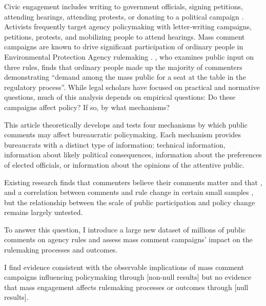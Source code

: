 \documentclass{article}
\begin{document}
Civic engagement includes writing to government officials, signing petitions, attending hearings, attending protests, or donating to a political campaign \citep{Verba1987}. %
Activists frequently target agency policymaking with letter-writing campaigns, petitions, protests, and mobilizing people to attend hearings. 
Mass comment campaigns are known to drive significant participation of ordinary people in Environmental Protection Agency rulemaking \citet{Potter2017, Balla2018}. \citet{Cuellar2005}, who examines public input on three rules, finds that ordinary people made up the majority of commenters demonstrating ``demand among the mass public for a seat at the table in the regulatory process''. While legal scholars have focused on practical and normative questions, much of this analysis depends on empirical questions: Do these campaigns affect policy? If so, by what mechanisms? 

This article theoretically develops and tests four mechanisms by which public comments may affect bureaucratic policymaking. Each mechanism provides bureaucrats with a distinct type of information: technical information, information about likely political consequences, information about the preferences of elected officials, or information about the opinions of the attentive public. 

Existing research finds that commenters believe their comments matter and that 
\citep{Yackee2015JPART}, %
and a correlation between comments and rule change in certain small samples
\citep{Shapiro2008}, but the relationship between the scale of public participation and policy change remains largely untested. 

To answer this question, I introduce a large new dataset of millions of public comments on agency rules and assess mass comment campaigns' impact on the rulemaking processes and outcomes. %

I find evidence consistent with the observable implications of mass comment campaigns influencing policymaking through [non-null results] but no evidence that mass engagement affects rulemaking processes or outcomes through [null results].


\singlespace
\small
 

\end{document}
